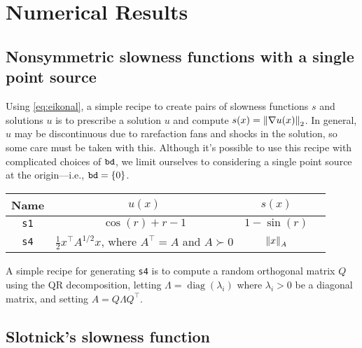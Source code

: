 \documentclass[sisc-eikonal.tex]{subfiles}
\begin{document}
\section{Numerical Results}\label{sec:numerical-results}

\subsection[Single point source]{Nonsymmetric slowness functions with
  a single point source}\label{ssec:point-source-problems}

Using \cref{eq:eikonal}, a simple recipe to create pairs of slowness
functions $s$ and solutions $u$ is to prescribe a solution $u$ and
compute $s(x) = \left\|\nabla u(x)\right\|_2$. In general, $u$ may be
discontinuous due to rarefaction fans and shocks in the solution, so
some care must be taken with this. Although it's possible to use this
recipe with complicated choices of $\texttt{bd}$, we limit ourselves to
considering a single point source at the origin---i.e.,
$\texttt{bd} = \left\{0\right\}$.

\begin{center}
  \begin{tabular}{cccc}
    Name & $u(x)$ & $s(x)$ \\
    \midrule
    \texttt{s1} & $\cos(r) + r - 1$ & $1 - \sin(r)$ \\
    \texttt{s4} & $\tfrac{1}{2} x^\top A^{1/2} x$, where $A^\top = A$ and $A \succ 0$ & $\left\|x\right\|_A$
  \end{tabular}
\end{center}

A simple recipe for generating \texttt{s4} is to compute a random
orthogonal matrix $Q$ using the QR decomposition, letting
$\Lambda = \operatorname{diag}(\lambda_i)$ where $\lambda_i > 0$ be a
diagonal matrix, and setting $A = Q\Lambda Q^\top$.

\subsection{Slotnick's slowness function}\label{ssec:slotnick}
\end{document}
